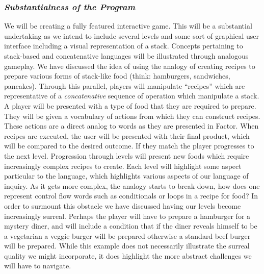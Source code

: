 \documentclass{sig-alternate}
\begin{document}
\subsubsection*{\textit{Substantialness of the Program}}
We will be
creating a fully featured interactive game. This will be a substantial
undertaking as we intend to include several levels and some sort of
graphical user interface including a visual representation of a stack.
Concepts pertaining to stack-based and concatenative languages will be
illustrated through analogous gameplay. We have discussed the idea of
using the analogy of creating recipes to prepare various forms of
stack-like food (think: hamburgers, sandwiches, pancakes). Through
this parallel, players will manipulate ``recipes'' which are
representative of a \textit{concatenative} sequence of operation which
manipulate a stack. A player will be presented with a type of food
that they are required to prepare. They will be given a vocabulary of
actions from which they can construct recipes. These actions are a
direct analog to words as they are presented in Factor. When recipes
are executed, the user will be presented with their final product,
which will be compared to the desired outcome. If they match the
player progresses to the next level. Progression through levels will
present new foods which require increasingly complex recipes to
create. Each level will highlight some aspect particular to the
language, which highlights various aspects of our language of inquiry.
As it gets more complex, the analogy starts to break down, how does
one represent control flow words such as conditionals or loops in a
recipe for food? In order to surmount this obstacle we have discussed
having our levels become increasingly surreal.  Perhaps the player
will have to prepare a hamburger for a mystery diner, and will
include a condition that if the diner reveals himself to be a
vegetarian a veggie burger will be prepared otherwise a standard beef
burger will be prepared. While this example does not necessarily
illustrate the surreal quality we might incorporate, it does highlight
the more abstract challenges we will have to navigate.
\end{document}
